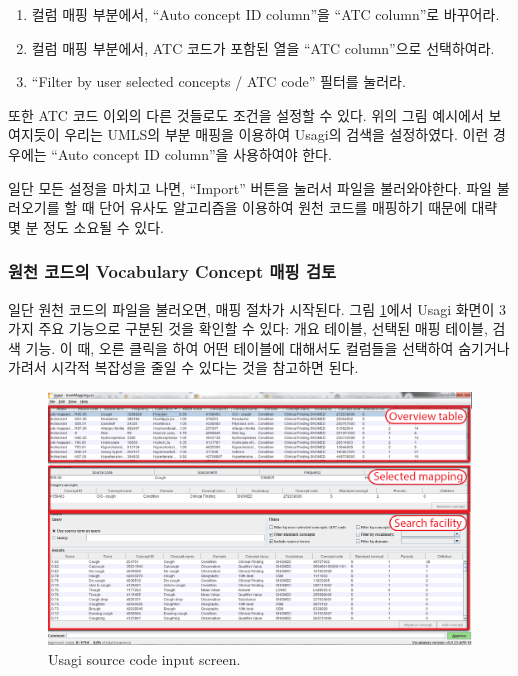 \documentclass[11pt]{book}
\providecommand{\tightlist}{%
  \setlength{\itemsep}{0pt}\setlength{\parskip}{0pt}}
\theoremstyle{definition}
\theoremstyle{definition}
\theoremstyle{definition}
\theoremstyle{remark}
\begin{document}
\begin{enumerate}
\def\labelenumi{\arabic{enumi}.}
\tightlist
\item
  컬럼 매핑 부분에서, ``Auto concept ID column''을 ``ATC column''로
  바꾸어라.
\item
  컬럼 매핑 부분에서, ATC 코드가 포함된 열을 ``ATC column''으로
  선택하여라.
\item
  ``Filter by user selected concepts / ATC code'' 필터를 눌러라.
\end{enumerate}

또한 ATC 코드 이외의 다른 것들로도 조건을 설정할 수 있다. 위의 그림
예시에서 보여지듯이 우리는 UMLS의 부분 매핑을 이용하여 Usagi의 검색을
설정하였다. 이런 경우에는 ``Auto concept ID column''을 사용하여야 한다.

일단 모든 설정을 마치고 나면, ``Import'' 버튼을 눌러서 파일을
불러와야한다. 파일 불러오기를 할 때 단어 유사도 알고리즘을 이용하여 원천
코드를 매핑하기 때문에 대략 몇 분 정도 소요될 수 있다.

\subsubsection*{원천 코드의 Vocabulary Concept 매핑
검토}\label{--vocabulary-concept--}

일단 원천 코드의 파일을 불러오면, 매핑 절차가 시작된다. 그림
\ref{fig:usagiOverview}에서 Usagi 화면이 3가지 주요 기능으로 구분된 것을
확인할 수 있다: 개요 테이블, 선택된 매핑 테이블, 검색 기능. 이 때, 오른
클릭을 하여 어떤 테이블에 대해서도 컬럼들을 선택하여 숨기거나 가려서
시각적 복잡성을 줄일 수 있다는 것을 참고하면 된다.

\begin{figure}

{\centering \includegraphics[width=1\linewidth]{images/ExtractTransformLoad/usagiOverview} 

}

\caption{Usagi source code input screen.}\label{fig:usagiOverview}
\end{figure}
\end{document}
